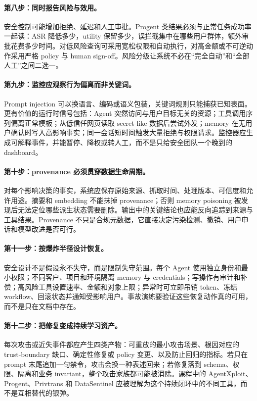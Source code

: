 \documentclass[a4paper]{article}
\begin{document}
\paragraph{第八步：同时报告风险与效用。}
安全控制可能增加拒绝、延迟和人工审批。Progent 类结果必须与正常任务成功率一起读：ASR 降低多少，utility 保留多少，误拦截集中在哪些用户群体，额外审批花费多少时间。对低风险查询可采用宽松权限和自动执行，对高金额或不可逆动作采用严格 policy 与 human sign-off。风险分级让系统不必在“完全自动”和“全部人工”之间二选一。

\paragraph{第九步：监控应观察行为偏离而非关键词。}
Prompt injection 可以换语言、编码或语义包装，关键词规则只能捕获已知表面。更有价值的运行时信号包括：Agent 突然访问与用户目标无关的资源；工具调用序列偏离正常模板；从低信任网页读取 secret-like 数据后尝试外发；memory 在无用户确认时写入高影响事实；同一会话短时间触发大量拒绝与权限请求。监控器应生成可解释事件，并能暂停、降权或转人工，而不是只给安全团队一个晚到的 dashboard。

\paragraph{第十步：provenance 必须贯穿数据生命周期。}
对每个影响决策的事实，系统应保存原始来源、抓取时间、处理版本、可信度和允许用途。摘要和 embedding 不能抹掉 provenance；否则 memory poisoning 被发现后无法定位哪些派生状态需要删除。输出中的关键结论也应能反向追踪到来源与工具结果。Provenance 不只是合规元数据，它直接决定污染检测、撤销、用户申诉和模型改进是否可行。

\paragraph{第十一步：按爆炸半径设计恢复。}
安全设计不是假设永不失守，而是限制失守范围。每个 Agent 使用独立身份和最小权限；不同客户、项目和环境隔离 memory 与 credentials；写操作有审计和补偿；高风险工具设置速率、金额和对象上限；异常时可立即吊销 token、冻结 workflow、回滚状态并通知受影响用户。事故演练要验证这些恢复动作真的可用，而不是只在文档中存在。

\paragraph{第十二步：把修复变成持续学习资产。}
每次攻击或近失事件都应产生四类产物：可重放的最小攻击场景、根因对应的 trust-boundary 缺口、确定性修复或 policy 变更、以及防止回归的指标。若只在 prompt 末尾追加一句禁令，攻击会换一种表述回来；若修复落到 schema、权限、隔离和业务 invariant，整个攻击家族都可能被消除。课程中的 AgentXploit、Progent、Privtrans 和 DataSentinel 应被理解为这个持续闭环中的不同工具，而不是互相替代的银弹。
\end{document}
